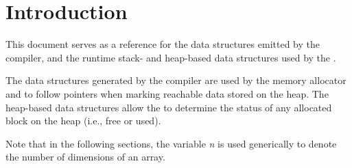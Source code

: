 \section{Introduction}\label{memlay}

This document serves as a reference for the data structures emitted by
the compiler, and the runtime stack- and heap-based data structures
used by the \gc.

The data structures generated by the compiler are used by the memory
allocator and \gc to follow pointers when marking reachable data
stored on the heap.  The heap-based data structures allow the \gc to
determine the status of any allocated block on the heap (i.e., free or
used).

Note that in the following sections, the variable \emph{n} is used
generically to denote the number of dimensions of an array.

